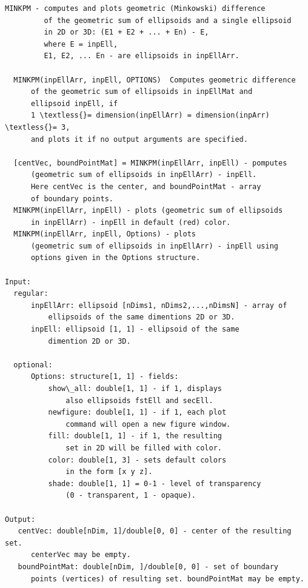 \documentclass[letterpaper,10pt,english]{sphinxmanual}
\begin{document}
\begin{Verbatim}[commandchars=\\\{\}]
MINKPM - computes and plots geometric (Minkowski) difference
         of the geometric sum of ellipsoids and a single ellipsoid
         in 2D or 3D: (E1 + E2 + ... + En) - E,
         where E = inpEll,
         E1, E2, ... En - are ellipsoids in inpEllArr.

  MINKPM(inpEllArr, inpEll, OPTIONS)  Computes geometric difference
      of the geometric sum of ellipsoids in inpEllMat and
      ellipsoid inpEll, if
      1 \textless{}= dimension(inpEllArr) = dimension(inpArr) \textless{}= 3,
      and plots it if no output arguments are specified.

  [centVec, boundPointMat] = MINKPM(inpEllArr, inpEll) - pomputes
      (geometric sum of ellipsoids in inpEllArr) - inpEll.
      Here centVec is the center, and boundPointMat - array
      of boundary points.
  MINKPM(inpEllArr, inpEll) - plots (geometric sum of ellipsoids
      in inpEllArr) - inpEll in default (red) color.
  MINKPM(inpEllArr, inpEll, Options) - plots
      (geometric sum of ellipsoids in inpEllArr) - inpEll using
      options given in the Options structure.

Input:
  regular:
      inpEllArr: ellipsoid [nDims1, nDims2,...,nDimsN] - array of
          ellipsoids of the same dimentions 2D or 3D.
      inpEll: ellipsoid [1, 1] - ellipsoid of the same
          dimention 2D or 3D.

  optional:
      Options: structure[1, 1] - fields:
          show\_all: double[1, 1] - if 1, displays
              also ellipsoids fstEll and secEll.
          newfigure: double[1, 1] - if 1, each plot
              command will open a new figure window.
          fill: double[1, 1] - if 1, the resulting
              set in 2D will be filled with color.
          color: double[1, 3] - sets default colors
              in the form [x y z].
          shade: double[1, 1] = 0-1 - level of transparency
              (0 - transparent, 1 - opaque).

Output:
   centVec: double[nDim, 1]/double[0, 0] - center of the resulting set.
      centerVec may be empty.
   boundPointMat: double[nDim, ]/double[0, 0] - set of boundary
      points (vertices) of resulting set. boundPointMat may be empty.
\end{Verbatim}
\end{document}
